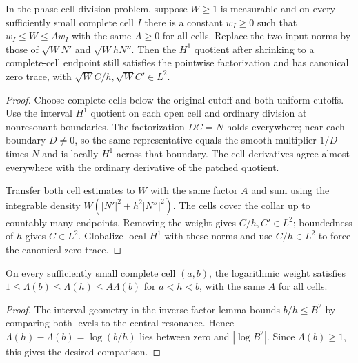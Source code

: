 \begin{lemma}
\label{lem:comparable-weight-phase-division}
\leanok
In the phase-cell division problem, suppose $W\ge1$ is measurable and
on every sufficiently small complete cell $I$ there is a constant $w_I\ge0$
such that $w_I\le W\le A w_I$ with the same $A\ge0$ for all cells.
Replace the two input norms by those of $\sqrt W N'$ and $\sqrt W hN''$.
Then the $H^1$ quotient after shrinking to a complete-cell endpoint still
satisfies the pointwise factorization and has canonical zero trace, with
$\sqrt W C/h,\sqrt W C'\in L^2$.
\end{lemma}

\begin{proof}
\leanok
Choose complete cells below the original cutoff and both uniform cutoffs.
Use the interval $H^1$ quotient on each open cell and ordinary division
at nonresonant boundaries. The factorization $DC=N$ holds everywhere;
near each boundary $D\ne0$, so the same representative equals the smooth
multiplier $1/D$ times $N$ and is locally $H^1$ across that boundary.
The cell derivatives agree almost everywhere with the ordinary derivative
of the patched quotient.

Transfer both cell estimates to $W$ with the same factor $A$ and sum using
the integrable density $W(|N'|^2+h^2|N''|^2)$. The cells cover the collar up
to countably many endpoints. Removing the weight gives $C/h,C'\in L^2$;
boundedness of $h$ gives $C\in L^2$. Globalize local $H^1$ with these norms
and use $C/h\in L^2$ to force the canonical zero trace.
\end{proof}

\begin{lemma}
\label{lem:log-phase-weight-comparison}
\leanok
On every sufficiently small complete cell $(a,b)$, the logarithmic
weight satisfies $1\le \Lambda(b)\le\Lambda(h)\le A\Lambda(b)$
for $a<h<b$, with the same $A$ for all cells.
\end{lemma}
\begin{proof}
\leanok
The interval geometry in the inverse-factor lemma bounds $b/h\le B^2$
by comparing both levels to the central resonance. Hence
$\Lambda(h)-\Lambda(b)=\log(b/h)$ lies between zero and
$|\log B^2|$. Since $\Lambda(b)\ge1$, this gives the desired comparison.
\end{proof}


